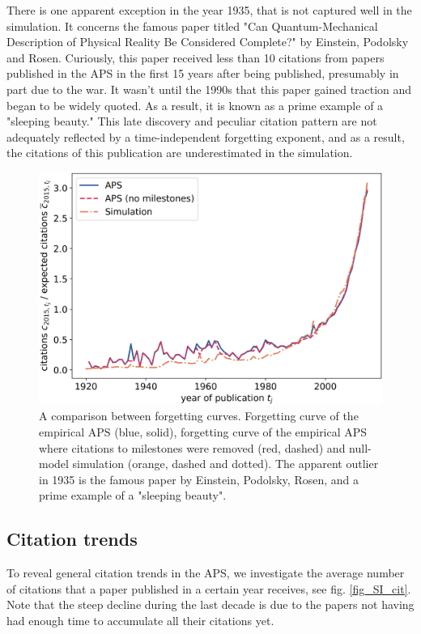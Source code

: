 \documentclass[draft,final]{vutinfth} %
\begin{document}
There is one apparent exception in the year 1935, that is not captured well in the simulation. It concerns the famous paper titled "Can Quantum-Mechanical Description of Physical Reality Be Considered Complete?" by Einstein, Podolsky and Rosen. Curiously, this paper received less than 10 citations from papers published in the APS in the first 15 years after being published, presumably in part due to the war. It wasn't until the 1990s that this paper gained traction and began to be widely quoted. As a result, it is known as a prime example of a "sleeping beauty." This late discovery and peculiar citation pattern are not adequately reflected by a time-independent forgetting exponent, and as a result, the citations of this publication are underestimated in the simulation.

\begin{figure}[!ht]
	\centering
	 \includegraphics[width=0.7\columnwidth]{figures_aps/SI7.png}
	\caption{A comparison between forgetting curves. Forgetting curve of the empirical APS (blue, solid), forgetting curve of the empirical APS where citations to milestones were removed (red, dashed) and null-model simulation (orange, dashed and dotted). The apparent outlier in 1935 is the famous paper by Einstein, Podolsky, Rosen, and a prime example of a "sleeping beauty". 
	}
	\label{fig:SI6}
\end{figure}


\subsection{Citation trends}
\label{SI7}
To reveal general citation trends in the APS, we investigate the average number of citations that a paper published in a certain year receives, see fig. \ref{fig_SI_cit}. Note that the steep decline during the last decade is due to the papers not having had enough time to accumulate all their citations yet.
\end{document}
